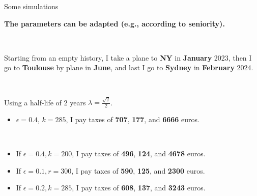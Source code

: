 \documentclass[french, english]{beamer}
\begin{document}
\begin{frame}{Some simulations}

    \textbf{The parameters can be adapted (e.g., according to seniority).}
    
    \
    
    Starting from an empty history, I take a plane to \textbf{NY} in \textbf{January} 2023, then I go to \textbf{Toulouse} by plane in \textbf{June}, and  last I go to \textbf{Sydney} in \textbf{February} 2024. 
    
    \
    
    Using a half-life of 2 years $\lambda = \frac{\sqrt{2}}{2}$.
    \begin{itemize}
    \item $\epsilon = 0.4$, $k=285$, I pay taxes of \textbf{707}, \textbf{177}, and \textbf{6666} euros.
    \end{itemize}
    
    \
    
    \begin{itemize}
    \item If $\epsilon = 0.4, k = 200$, I pay taxes of \textbf{496}, \textbf{124}, and \textbf{4678} euros. 
    \item If $\epsilon = 0.1, r = 300$, I pay taxes of \textbf{590}, \textbf{125}, and \textbf{2300} euros.
    \item If $\epsilon = 0.2, k = 285$, I pay taxes of \textbf{608}, \textbf{137}, and \textbf{3243} euros. 
    \end{itemize}
\end{frame}
\end{document}
